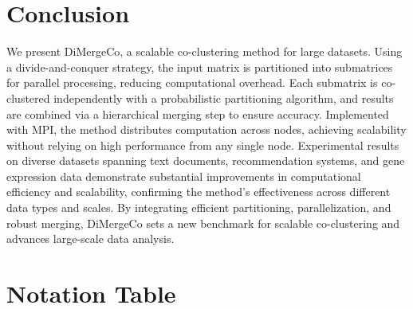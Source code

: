 \documentclass[journal]{IEEEtran}
\theoremstyle{definition}
\theoremstyle{remark} %
\begin{document}
\section{Conclusion}
\label{sec:conclusion}
We present DiMergeCo, a scalable co-clustering method for large datasets. Using a divide-and-conquer strategy, the input matrix is partitioned into submatrices for parallel processing, reducing computational overhead. Each submatrix is co-clustered independently with a probabilistic partitioning algorithm, and results are combined via a hierarchical merging step to ensure accuracy. Implemented with MPI, the method distributes computation across nodes, achieving scalability without relying on high performance from any single node. {\color{blue}Experimental results on diverse datasets spanning text documents, recommendation systems, and gene expression data demonstrate substantial improvements in computational efficiency and scalability, confirming the method's effectiveness across different data types and scales.} By integrating efficient partitioning, parallelization, and robust merging, DiMergeCo sets a new benchmark for scalable co-clustering and advances large-scale data analysis.

\printbibliography

\appendix

\section{Notation Table}
\label{appendix:notation}
\end{document}
